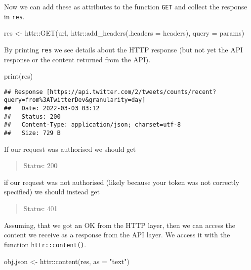 \documentclass[
]{article}
\newenvironment{Shaded}{\begin{snugshade}}{\end{snugshade}}
\newcommand{\AttributeTok}[1]{\textcolor[rgb]{0.77,0.63,0.00}{#1}}
\newcommand{\FunctionTok}[1]{\textcolor[rgb]{0.00,0.00,0.00}{#1}}
\newcommand{\NormalTok}[1]{#1}
\newcommand{\OtherTok}[1]{\textcolor[rgb]{0.56,0.35,0.01}{#1}}
\newcommand{\SpecialCharTok}[1]{\textcolor[rgb]{0.00,0.00,0.00}{#1}}
\newcommand{\StringTok}[1]{\textcolor[rgb]{0.31,0.60,0.02}{#1}}
\begin{document}
Now we can add these as attributes to the function \texttt{GET} and collect the response in \texttt{res}.

\begin{Shaded}
\begin{Highlighting}[]
\NormalTok{res }\OtherTok{\textless{}{-}} 
\NormalTok{  httr}\SpecialCharTok{::}\FunctionTok{GET}\NormalTok{(url,}
\NormalTok{            httr}\SpecialCharTok{::}\FunctionTok{add\_headers}\NormalTok{(}\AttributeTok{.headers =}\NormalTok{ headers),}
            \AttributeTok{query =}\NormalTok{ params)}
\end{Highlighting}
\end{Shaded}

By printing \texttt{res} we see details about the HTTP response (but not yet the API response or the content returned from the API).

\begin{Shaded}
\begin{Highlighting}[]
\FunctionTok{print}\NormalTok{(res)}
\end{Highlighting}
\end{Shaded}

\begin{verbatim}
## Response [https://api.twitter.com/2/tweets/counts/recent?query=from%3ATwitterDev&granularity=day]
##   Date: 2022-03-03 03:12
##   Status: 200
##   Content-Type: application/json; charset=utf-8
##   Size: 729 B
\end{verbatim}

If our request was authorised we should get

\begin{quote}
Status: 200
\end{quote}

if our request was not authorised (likely because your token was not correctly specified) we should instead get

\begin{quote}
Status: 401
\end{quote}

Assuming, that we got an OK from the HTTP layer, then we can access the content we receive as a response from the API layer. We access it with the function \texttt{httr::content()}.

\begin{Shaded}
\begin{Highlighting}[]
\NormalTok{obj.json }\OtherTok{\textless{}{-}} 
\NormalTok{  httr}\SpecialCharTok{::}\FunctionTok{content}\NormalTok{(res, }\AttributeTok{as =} \StringTok{"text"}\NormalTok{)}
\end{Highlighting}
\end{Shaded}
\end{document}
